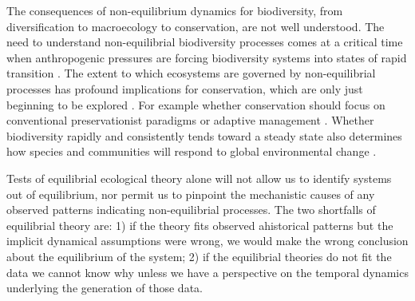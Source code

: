 \documentclass[12pt]{article}
\begin{document}
The consequences of non-equilibrium dynamics for biodiversity, from
diversification to macroecology to conservation, are not well
understood. The need to understand non-equilibrial biodiversity
processes comes at a critical time when anthropogenic pressures are
forcing biodiversity systems into states of rapid transition
\citep{Barnosky2012-qz}. The extent to which ecosystems are governed
by non-equilibrial processes has profound implications for
conservation, which are only just beginning to be explored
\citep{Wallington2005-kv}. For example whether conservation should
focus on conventional preservationist paradigms or adaptive management
\citep{Wallington2005-kv}. Whether biodiversity rapidly and
consistently tends toward a steady state also determines how species
and communities will respond to global environmental change
\citep{Barnosky2012-qz}.

Tests of equilibrial ecological theory alone will not allow us to
identify systems out of equilibrium, nor permit us to pinpoint the
mechanistic causes of any observed patterns indicating non-equilibrial
processes. The two shortfalls of equilibrial theory are: 1) if the
theory fits observed ahistorical patterns but the implicit dynamical
assumptions were wrong, we would make the wrong conclusion about the
equilibrium of the system; 2) if the equilibrial theories do not fit
the data we cannot know why unless we have a perspective on the
temporal dynamics underlying the generation of those data. 



\end{document}
